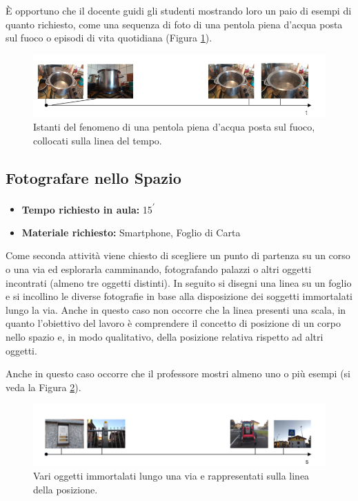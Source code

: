 \documentclass{report} \usepackage[T1]{fontenc} \usepackage[italian]{babel}
\begin{document}
\`E opportuno che il docente guidi gli studenti mostrando loro un paio di esempi
di quanto richiesto, come una sequenza di foto di una pentola piena d’acqua
posta sul fuoco o episodi di vita quotidiana (Figura \ref{fig:asse_t_pentola}).
\begin{figure}[H]
\centering
  \includegraphics[width=\textwidth]{asse_t_pentola}
  \caption{Istanti del fenomeno di una pentola piena d'acqua posta sul fuoco,
           collocati sulla linea del tempo.}
  \label{fig:asse_t_pentola}
\end{figure}

\subsection{Fotografare nello Spazio}

\begin{itemize}
\item \textbf{Tempo richiesto in aula:} 15\textsuperscript{$\prime$}
\item \textbf{Materiale richiesto:} Smartphone, Foglio di Carta
\end{itemize}

Come seconda attività viene chiesto di scegliere un punto di partenza su un
corso o una via ed esplorarla camminando, fotografando palazzi o altri oggetti
incontrati (almeno tre oggetti distinti). In seguito si disegni una linea su un
foglio e si incollino le diverse fotografie in base alla disposizione dei
soggetti immortalati lungo la via. Anche in questo caso non occorre che la
linea presenti una scala, in quanto l’obiettivo del lavoro è comprendere il
concetto di posizione di un corpo nello spazio e, in modo qualitativo, della
posizione relativa rispetto ad altri oggetti.

Anche in questo caso occorre che il professore mostri almeno uno o più esempi
(si veda la Figura \ref{fig:asse_s}).
\begin{figure}[H]
\centering
  \includegraphics[width=\textwidth]{asse_s}
  \caption{Vari oggetti immortalati lungo una via e rappresentati
           sulla linea della posizione.}
  \label{fig:asse_s}
\end{figure}
\end{document}
